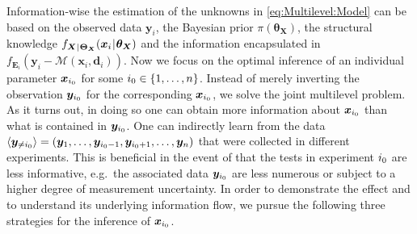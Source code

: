Information-wise the estimation of the unknowns in \cref{eq:Multilevel:Model} can be based on the observed data \(\bm{y}_i\), the Bayesian prior \(\pi(\bm{\theta}_{\bm{X}})\),
the structural knowledge \(f_{\bm{X} {\:\!}|{\:\!} \bm{\Theta}_{\bm{X}}}(\bm{x}_i {\:\!}|{\:\!} \bm{\theta}_{\bm{X}})\) and the information encapsulated in \(f_{\bm{E}_i}(\bm{y}_i-\mathcal{M}(\bm{x}_i,\bm{d}_i))\).
Now we focus on the optimal inference of an individual parameter \(\bm{x}_{i_0}\) for some \(i_0 \in \{1,\ldots,n\}\).
Instead of merely inverting the observation \(\bm{y}_{i_0}\) for the corresponding \(\bm{x}_{i_0}\), we solve the joint multilevel problem.
As it turns out, in doing so one can obtain more information about \(\bm{x}_{i_0}\) than what is contained in \(\bm{y}_{i_0}\).
One can indirectly learn from the data \(\langle{\bm{y}_{\neq i_0}}\rangle = (\bm{y}_1,\ldots,\bm{y}_{i_0-1},\bm{y}_{i_0+1},\ldots,\bm{y}_n)\) that were collected in different experiments.
This is beneficial in the event of that the tests in experiment \(i_0\) are less informative, e.g.\ the associated data \(\bm{y}_{i_0}\) are less numerous or subject to a higher degree of measurement uncertainty.
In order to demonstrate the effect and to understand its underlying information flow, we pursue the following three strategies for the inference of \(\bm{x}_{i_0}\).

